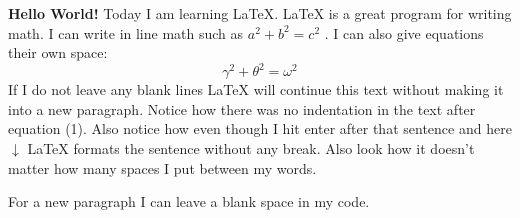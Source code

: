 \documentclass{report}
\begin{document}
    
    \textbf{Hello World!} Today I am learning \LaTeX. %
     \LaTeX{} is a great program for writing math. I can write in line math such as $a^2+b^2=c^2$ %
     . I can also give equations their own space: \cite{IEEE_2020}
    \begin{equation} %
    \gamma^2+\theta^2=\omega^2 
    \end{equation}
    If I do not leave any blank lines \LaTeX{} will continue  this text without making it into a new paragraph.  Notice how there was no indentation in the text after equation (1).  
    Also notice how even though I hit enter after that sentence and here $\downarrow$
     \LaTeX{} formats the sentence without any break.  Also   look  how      it   doesn't     matter          how    many  spaces     I put     between       my    words.
    
    For a new paragraph I can leave a blank space in my code. 


    
    
\end{document}
